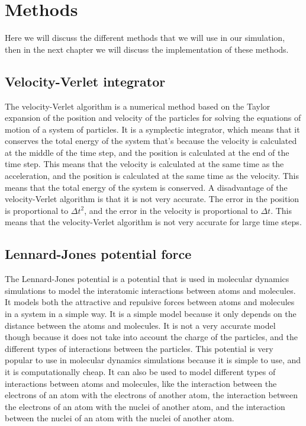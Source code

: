\chapter{Methods}\label{chap:Methods}

    Here we will discuss the different methods that we will use in our simulation, then in the next chapter we will discuss the implementation of these methods.

\section{Velocity-Verlet integrator}
    The velocity-Verlet algorithm is a numerical method based on the Taylor expansion of the position and velocity of the particles for solving the equations of motion of a system of particles. It is a symplectic integrator, which means that it conserves the total energy of the system that's because the velocity is calculated at the middle of the time step, and the position is calculated at the end of the time step. This means that the velocity is calculated at the same time as the acceleration, and the position is calculated at the same time as the velocity. This means that the total energy of the system is conserved. A disadvantage of the velocity-Verlet algorithm is that it is not very accurate. The error in the position is proportional to $\Delta t^2$, and the error in the velocity is proportional to $\Delta t$. This means that the velocity-Verlet algorithm is not very accurate for large time steps.

\section{Lennard-Jones potential force}
    The Lennard-Jones potential is a potential that is used in molecular dynamics simulations to model the interatomic interactions between atoms and molecules. It models both the attractive and repulsive forces between atoms and molecules in a system in a simple way. It is a simple model because it only depends on the distance between the atoms and molecules. It is not a very accurate model though because it does not take into account the charge of the particles, and the different types of interactions between the particles. This potential is very popular to use in molecular dynamics simulations because it is simple to use, and it is computationally cheap. It can also be used to model different types of interactions between atoms and molecules, like the interaction between the electrons of an atom with the electrons of another atom, the interaction between the electrons of an atom with the nuclei of another atom, and the interaction between the nuclei of an atom with the nuclei of another atom.

